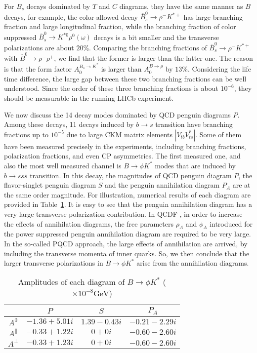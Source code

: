 \documentclass[11pt]{article}
\begin{document}
For $B_s$ decays dominated by $T$ and $C$ diagrams, they have the same manner as $B$ decays, for example, the color-allowed decay $\overline B_s^0 \to \rho^-K^{*+}$ has large branching fraction  and large  longitudinal fraction, while the branching fraction of color suppressed $\overline B_s^0 \to K^{*0}\rho^0(\omega)$ decays is a bit smaller and the transverse polarizations are about $20\%$. Comparing the branching fractions of $\overline B_s^0 \to \rho^-K^{*+}$ with $\overline B^0\to\rho^-\rho^+$, we find that the former is larger than the latter one. The reason is that the form factor $A_0^{B_s \to K^*}$ is larger than $A_0^{B \to \rho}$ by $13\%$. Considering the life time difference, the large gap between these two branching fractions can be well understood. Since the order of these three branching fractions is about $10^{-6}$,     they should be measurable in the running LHCb experiment.


We now  discuss the 14 decay modes dominated by QCD penguin diagrams $P$. Among these decays, 11 decays induced by $b\to s$ transition have branching fractions up to $10^{-5}$ due to large CKM matrix elements $|V_{tb}V_{ts}^*|$.   Some of them have been measured precisely in the experiments, including branching fractions, polarization fractions,  and even CP asymmetries. The  first measured one, and also the most well measured channel is  $B\to \phi K^*$ modes that are induced by $b\to ss\bar s$ transition.  In this decay, the magnitudes of QCD penguin diagram $P$, the flavor-singlet penguin diagram $S$ and the penguin annihilation diagram $P_A$ are at the same order magnitude.  For illustration,  numerical results of each diagram are provided in Table~\ref{VVam}.  It is easy to see that   the penguin annihilation diagram has a very large transverse polarization contribution.  In QCDF \cite{Beneke:2006hg, Cheng:2008gxa}, in order to increase the effects of annihilation diagrams,  the free parameters    $\rho_A$ and $\phi_A$ introduced for the power suppressed penguin annihilation diagram are required to be very large. In the so-called PQCD approach, the large effects of annihilation are arrived, by including the transverse momenta of inner quarks. So, we then conclude that the larger transverse polarizations in $B\to \phi K^*$ arise from the annihilation diagrams.

\begin{table}%
\begin{center}
\caption{Amplitudes of each diagram of $B\to \phi K^*$ ($\times 10^{-8} \mathrm{GeV}$)}\label{VVam}
\renewcommand*{\arraystretch}{0.8}
\begin{tabular}{c ccc}
 \hline
   &$P$ &$S$ & $P_A$    \\
\hline
$A^0$
& $-1.36+5.01 i$
& $1.39-0.43 i$
& $-0.21-2.29 i$   \\
$A^\parallel$
& $-0.33+1.22 i$
& $0+0 i$
& $-0.60-2.60 i$   \\
$A^\perp$
& $-0.33+1.23 i$
& $0+0 i$
& $-0.60 -2.60 i$   \\
\hline
\end{tabular}
\end{center}
\end{table}
\end{document}
